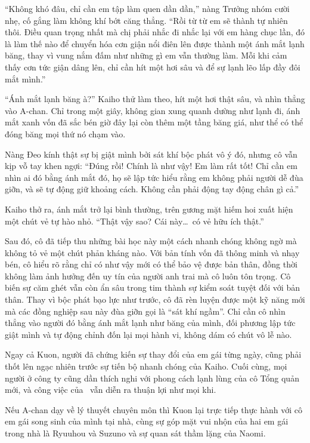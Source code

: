 \documentclass[../main.tex]{subfiles}
\begin{document}
``Không khó đâu, chỉ cần em tập làm quen dần dần,'' nàng Trưởng nhóm cười nhẹ, cố gắng làm không khí bớt căng thẳng. ``Rồi từ từ em sẽ thành tự nhiên thôi. Điều quan trọng nhất mà chị phải nhắc đi nhắc lại với em hàng chục lần, đó là làm thế nào để chuyển hóa cơn giận nổi điên lên được thành một ánh mắt lạnh băng, thay vì vung nắm đấm như những gì em vẫn thường làm. Mỗi khi cảm thấy cơn tức giận dâng lên, chỉ cần hít một hơi sâu và để sự lạnh lẽo lấp đầy đôi mắt mình.''

``Ánh mắt lạnh băng à?'' Kaiho thử làm theo, hít một hơi thật sâu, và nhìn thẳng vào A-chan. Chỉ trong một giây, không gian xung quanh dường như lạnh đi, ánh mắt xanh vốn đã sắc bén giờ đây lại còn thêm một tầng băng giá, như thể có thể đóng băng mọi thứ nó chạm vào.

Nàng Đeo kính thật sự bị giật mình bởi sát khí bộc phát vô ý đó, nhưng cô vẫn kịp vỗ tay khen ngợi: ``Đúng rồi! Chính là như vậy! Em làm rất tốt! Chỉ cần em nhìn ai đó bằng ánh mắt đó, họ sẽ lập tức hiểu rằng em không phải người dễ đùa giỡn, và sẽ tự động giữ khoảng cách. Không cần phải động tay động chân gì cả.''

Kaiho thở ra, ánh mắt trở lại bình thường, trên gương mặt hiếm hoi xuất hiện một chút vẻ tự hào nhỏ. ``Thật vậy sao? Cái này\dots\ có vẻ hữu ích thật.''

Sau đó, cô đã tiếp thu những bài học này một cách nhanh chóng không ngờ mà không tỏ vẻ một chút phản kháng nào. Với bản tính vốn đã thông minh và nhạy bén, cô hiểu rõ rằng chỉ có như vậy mới có thể bảo vệ được bản thân, đồng thời không làm ảnh hưởng đến uy tín của người anh trai mà cô luôn tôn trọng. Cô biến sự căm ghét vẫn còn ẩn sâu trong tim thành sự kiểm soát tuyệt đối với bản thân. Thay vì bộc phát bạo lực như trước, cô đã rèn luyện được một kỹ năng mới mà các đồng nghiệp sau này đùa giỡn gọi là ``sát khí ngầm''. Chỉ cần cô nhìn thẳng vào người đó bằng ánh mắt lạnh như băng của mình, đối phương lập tức giật mình và tự động chỉnh đốn lại mọi hành vi, không dám có chút vô lễ nào.

Ngay cả Kuon, người đã chứng kiến sự thay đổi của em gái từng ngày, cũng phải thốt lên ngạc nhiên trước sự tiến bộ nhanh chóng của Kaiho. Cuối cùng, mọi người ở công ty cũng dần thích nghi với phong cách lạnh lùng của cô Tổng quản mới, và công việc của \hls\ vẫn diễn ra thuận lợi như mọi khi.

\ct


Nếu A-chan dạy về lý thuyết chuyên môn thì Kuon lại trực tiếp thực hành với cô em gái song sinh của mình tại nhà, cùng sự góp mặt vui nhộn của hai em gái trong nhà là Ryuuhou và Suzuno và sự quan sát thầm lặng của Naomi.
\end{document}
